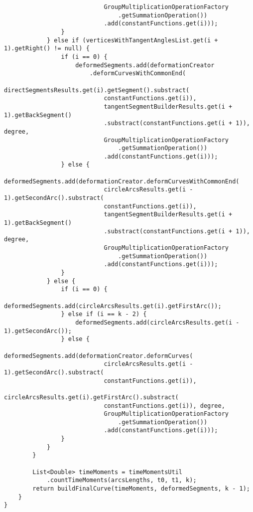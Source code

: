 \begin{verbatim}
                            GroupMultiplicationOperationFactory
                                .getSummationOperation())
                            .add(constantFunctions.get(i)));
                }
            } else if (verticesWithTangentAnglesList.get(i + 1).getRight() != null) {
                if (i == 0) {
                    deformedSegments.add(deformationCreator
                        .deformCurvesWithCommonEnd(
                            directSegmentsResults.get(i).getSegment().substract(
                            constantFunctions.get(i)),
                            tangentSegmentBuilderResults.get(i + 1).getBackSegment()
                            .substract(constantFunctions.get(i + 1)), degree,
                            GroupMultiplicationOperationFactory
                                .getSummationOperation())
                            .add(constantFunctions.get(i)));
                } else {
                    deformedSegments.add(deformationCreator.deformCurvesWithCommonEnd(
                            circleArcsResults.get(i - 1).getSecondArc().substract(
                            constantFunctions.get(i)),
                            tangentSegmentBuilderResults.get(i + 1).getBackSegment()
                            .substract(constantFunctions.get(i + 1)), degree,
                            GroupMultiplicationOperationFactory
                                .getSummationOperation())
                            .add(constantFunctions.get(i)));
                }
            } else {
                if (i == 0) {
                    deformedSegments.add(circleArcsResults.get(i).getFirstArc());
                } else if (i == k - 2) {
                    deformedSegments.add(circleArcsResults.get(i - 1).getSecondArc());
                } else {
                    deformedSegments.add(deformationCreator.deformCurves(
                            circleArcsResults.get(i - 1).getSecondArc().substract(
                            constantFunctions.get(i)),
                            circleArcsResults.get(i).getFirstArc().substract(
                            constantFunctions.get(i)), degree,
                            GroupMultiplicationOperationFactory
                                .getSummationOperation())
                            .add(constantFunctions.get(i)));
                }
            }
        }

        List<Double> timeMoments = timeMomentsUtil
            .countTimeMoments(arcsLengths, t0, t1, k);
        return buildFinalCurve(timeMoments, deformedSegments, k - 1);
    }
}
\end{verbatim}
